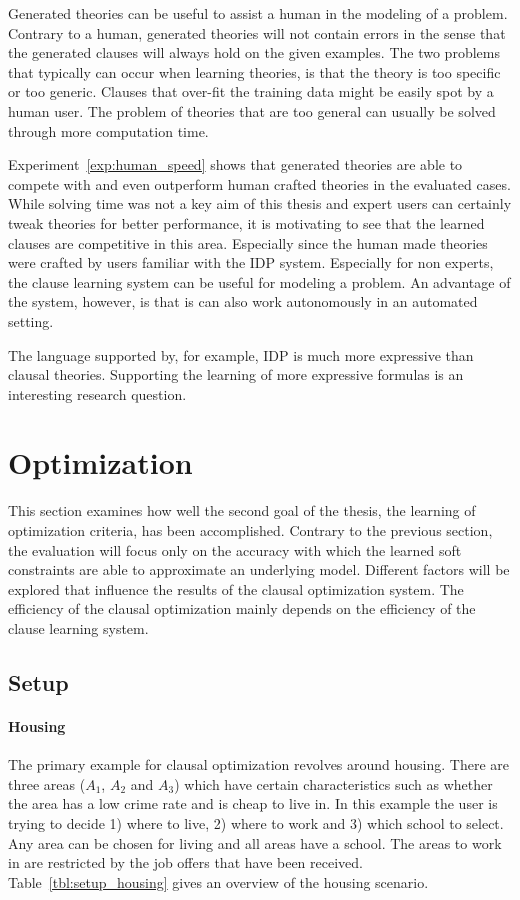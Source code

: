 Generated theories can be useful to assist a human in the modeling of a problem.
Contrary to a human, generated theories will not contain errors in the sense that the generated clauses will always hold on the given examples.
The two problems that typically can occur when learning theories, is that the theory is too specific or too generic.
Clauses that over-fit the training data might be easily spot by a human user.
The problem of theories that are too general can usually be solved through more computation time. 

Experiment~\ref{exp:human_speed} shows that generated theories are able to compete with and even outperform human crafted theories in the evaluated cases.
While solving time was not a key aim of this thesis and expert users can certainly tweak theories for better performance, it is motivating to see that the learned clauses are competitive in this area.
Especially since the human made theories were crafted by users familiar with the IDP system.
Especially for non experts, the clause learning system can be useful for modeling a problem.
An advantage of the system, however, is that is can also work autonomously in an automated setting.

The language supported by, for example, IDP is much more expressive than clausal theories.
Supporting the learning of more expressive formulas is an interesting research question.

\section{Optimization}
This section examines how well the second goal of the thesis, the learning of optimization criteria, has been accomplished.
Contrary to the previous section, the evaluation will focus only on the accuracy with which the learned soft constraints are able to approximate an underlying model.
Different factors will be explored that influence the results of the clausal optimization system.
The efficiency of the clausal optimization mainly depends on the efficiency of the clause learning system.

\subsection{Setup}

\paragraph{Housing}
The primary example for clausal optimization revolves around housing.
There are three areas ($A_1$, $A_2$ and $A_3$) which have certain characteristics such as whether the area has a low crime rate and is cheap to live in.
In this example the user is trying to decide 1) where to live, 2) where to work and 3) which school to select.
Any area can be chosen for living and all areas have a school.
The areas to work in are restricted by the job offers that have been received.
Table~\ref{tbl:setup_housing} gives an overview of the housing scenario.

